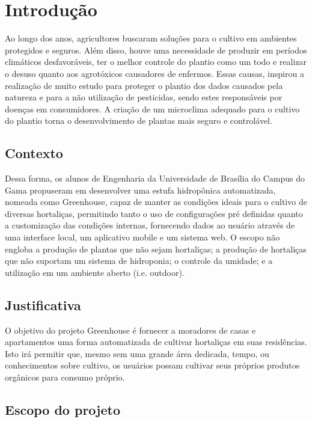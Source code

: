 \chapter[Introdução]{Introdução}

Ao longo dos anos, agricultores buscaram soluções para o cultivo em ambientes protegidos e seguros. Além disso, houve uma necessidade de produzir em períodos climáticos desfavoráveis, ter o melhor controle do plantio como um todo e realizar o desuso quanto aos agrotóxicos causadores de enfermos. Essas causas, inspirou a realização de muito estudo para proteger o plantio dos dados causados pela natureza e para a não utilização de pesticidas, sendo estes responsáveis por doenças em consumidores.
A criação de um microclima adequado para o cultivo do plantio torna o desenvolvimento de plantas mais seguro e controlável. 

\section{Contexto}
 
Dessa forma, os alunos de Engenharia da Universidade de Brasília do Campus do Gama propuseram em desenvolver uma estufa hidropônica automatizada, nomeada como Greenhouse, capaz de manter as condições ideais para o cultivo de diversas hortaliças, permitindo tanto o uso de configurações pré definidas quanto a customização das condições internas, fornecendo dados ao usuário através de uma interface local, um aplicativo mobile e um sistema
web. O escopo não engloba a produção de plantas que não sejam hortaliças; a produção de hortaliças que não suportam um sistema de hidroponia; o controle da umidade; e a utilização em um ambiente aberto (i.e. outdoor). 

\section{Justificativa}

O objetivo do projeto Greenhouse é fornecer a moradores de casas e apartamentos uma forma automatizada de cultivar hortaliças em suas residências. Isto irá permitir que, mesmo sem uma grande área dedicada, tempo, ou conhecimentos sobre cultivo, os usuários possam cultivar seus próprios produtos orgânicos para consumo próprio.

\section{Escopo do projeto}
